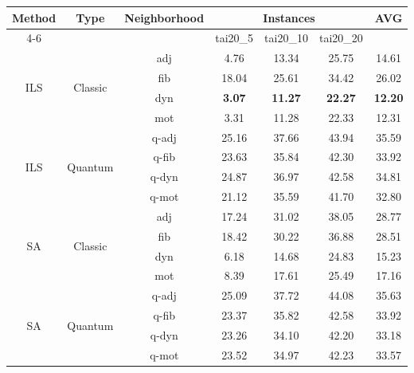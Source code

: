 \setlength{\tabcolsep}{3pt}

\begin{tabular}{@{}ccc cccc@{}}
\textbf{Method} & \textbf{Type} & \textbf{Neighborhood} & 
\multicolumn{3}{c}{\textbf{Instances}} & \textbf{AVG} \\
\cline{4-6}
& & & tai20\_5 & tai20\_10 & tai20\_20 & \\
\hline

\multirow{4}{*}{ILS}
& \multirow{4}{*}{Classic}
& adj & 4.76 & 13.34 & 25.75 & 14.61 \\
& & fib & 18.04 & 25.61 & 34.42 & 26.02 \\
& & dyn & {\bfseries 3.07} & {\bfseries 11.27} & {\bfseries 22.27} & {\bfseries 12.20} \\
& & mot & 3.31 & 11.28 & 22.33 & 12.31 \\

\multirow{4}{*}{ILS}
& \multirow{4}{*}{Quantum}
& q-adj & 25.16 & 37.66 & 43.94 & 35.59 \\
& & q-fib & 23.63 & 35.84 & 42.30 & 33.92 \\
& & q-dyn & 24.87 & 36.97 & 42.58 & 34.81 \\
& & q-mot & 21.12 & 35.59 & 41.70 & 32.80 \\

\hline

\multirow{4}{*}{SA}
& \multirow{4}{*}{Classic}
& adj & 17.24 & 31.02 & 38.05 & 28.77 \\
& & fib & 18.42 & 30.22 & 36.88 & 28.51 \\
& & dyn & 6.18 & 14.68 & 24.83 & 15.23 \\
& & mot & 8.39 & 17.61 & 25.49 & 17.16 \\

\multirow{4}{*}{SA}
& \multirow{4}{*}{Quantum}
& q-adj & 25.09 & 37.72 & 44.08 & 35.63 \\
& & q-fib & 23.37 & 35.82 & 42.58 & 33.92 \\
& & q-dyn & 23.26 & 34.10 & 42.20 & 33.18 \\
& & q-mot & 23.52 & 34.97 & 42.23 & 33.57 \\

\hline
\end{tabular}